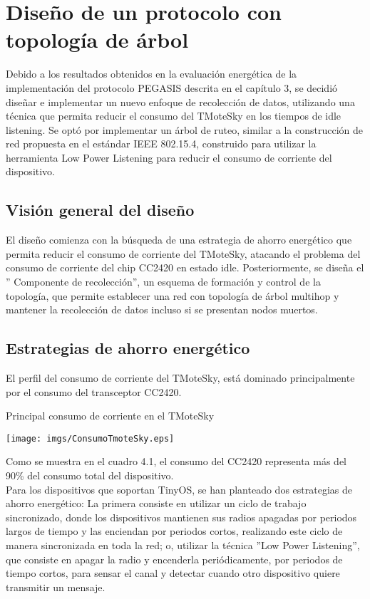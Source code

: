 \chapter{Diseño de un protocolo con topología de árbol}

Debido a los resultados obtenidos en la evaluación energética de la implementación del protocolo PEGASIS descrita en el capítulo 3, se decidió diseñar e implementar un nuevo enfoque de recolección de datos, utilizando una técnica que permita reducir el consumo del TMoteSky en los tiempos de idle listening. Se optó por implementar un árbol de ruteo, similar a la construcción de red propuesta en el estándar IEEE 802.15.4, construido para utilizar la herramienta Low Power Listening para reducir el consumo de corriente del dispositivo. \\

\section{Visión general del diseño}

El diseño comienza con la búsqueda de una estrategia de ahorro energético que permita reducir el consumo de corriente del TMoteSky, atacando el problema del consumo de corriente del chip CC2420 en estado idle. Posteriormente, se diseña el '' Componente de recolección'', un esquema de formación y control de la topología, que permite establecer una red con topología de árbol multihop y mantener la recolección de datos incluso si se presentan nodos muertos. 

\section{Estrategias de ahorro energético}
El perfil del consumo de corriente del TMoteSky, está dominado principalmente por el consumo del transceptor CC2420.

\begin{table}[H]
  \centering
  \caption{Principal consumo de corriente en el TMoteSky  \cite{TelosBConsumo}}
 \texttt{[image: imgs/ConsumoTmoteSky.eps]}
\end{table}

Como se muestra en el cuadro 4.1, el consumo del CC2420 representa más del 90\% del consumo total del dispositivo.\\

Para los dispositivos que soportan TinyOS, se han planteado dos estrategias de ahorro energético: La primera consiste en utilizar un ciclo de trabajo sincronizado, donde los dispositivos mantienen sus radios apagadas por periodos largos de tiempo y las enciendan por periodos cortos, realizando este ciclo de manera sincronizada en toda la red; o, utilizar la técnica ''Low Power Listening'', que consiste en apagar la radio y encenderla periódicamente, por periodos de tiempo cortos, para sensar el canal y detectar cuando otro dispositivo quiere transmitir un mensaje.\\

